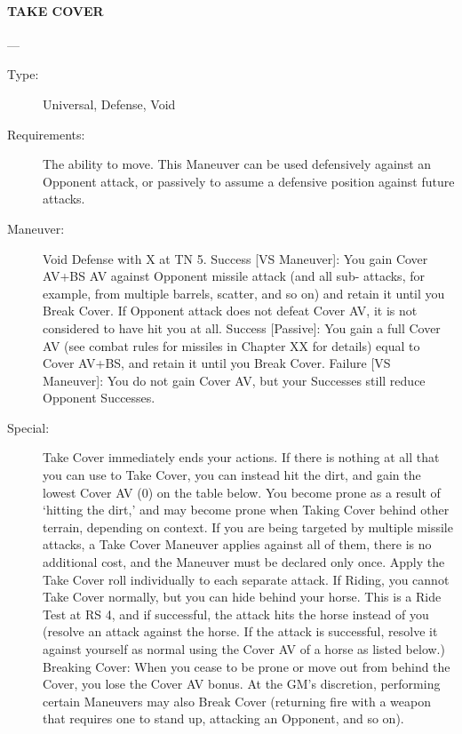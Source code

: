 \documentclass[oneside,11pt,english]{book}
\begin{document}
\paragraph{\large\label{man:TAKE COVER} TAKE COVER}---
\vspace{-10pt}\begin{description} 
\item [Type:] Universal, Defense, Void 
\item [Requirements:] The ability to move. This Maneuver can be used defensively against an Opponent attack, 
or passively to assume a defensive position against future attacks. 
\item [Maneuver:] Void Defense with X at TN 5. 
Success [VS Maneuver]: You gain Cover AV+BS AV against Opponent missile attack (and all sub-
attacks, for example, from multiple barrels, scatter, and so on) and retain it until you Break Cover. If 
Opponent attack does not defeat Cover AV, it is not considered to have hit you at all. 
Success [Passive]: You gain a full Cover AV (see combat rules for missiles in Chapter XX for details) 
equal to Cover AV+BS, and retain it until you Break Cover. 
Failure [VS Maneuver]: You do not gain Cover AV, but your Successes still reduce Opponent Successes. 
\item [Special:] Take Cover immediately ends your actions. If there is nothing at all that you can use to Take 
Cover, you can instead hit the dirt, and gain the lowest Cover AV (0) on the table below. You become 
prone as a result of ‘hitting the dirt,’ and may become prone when Taking Cover behind other terrain, 
depending on context. 
If you are being targeted by multiple missile attacks, a Take Cover Maneuver applies against all of them, 
there is no additional cost, and the Maneuver must be declared only once. Apply the Take Cover roll 
individually to each separate attack. 
If Riding, you cannot Take Cover normally, but you can hide behind your horse. This is a Ride Test at RS 
4, and if successful, the attack hits the horse instead of you (resolve an attack against the horse. If the 
attack is successful, resolve it against yourself as normal using the Cover AV of a horse as listed below.) 
Breaking Cover: When you cease to be prone or move out from behind the Cover, you lose the Cover 
AV bonus. At the GM’s discretion, performing certain Maneuvers may also Break Cover (returning fire 
with a weapon that requires one to stand up, attacking an Opponent, and so on). 
\end{description}
\end{document}
